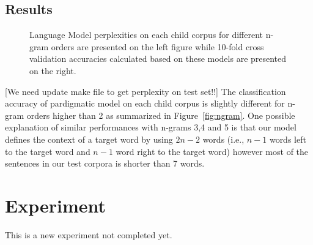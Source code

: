 \subsection{Results}
\begin{figure}[h!]
  \caption{Language Model perplexities on each child corpus for different
  n-gram orders are presented on the left figure while 10-fold cross validation
  accuracies calculated based on these models are presented on the right.} 
\end{figure}
[We need update make file to get perplexity on test set!!] The classification
accuracy of pardigmatic model on each child corpus is slightly different for
n-gram orders higher than 2 as summarized in Figure~\ref{fig:ngram}.  One
possible explanation of similar performances with n-grams 3,4 and 5 is that our
model defines the context of a target word by using $2n-2$ words (i.e., $n-1$
words left to the target word and $n-1$ word right to the target word) however
most of the sentences in our test corpora is shorter than 7 words.  
\section{Experiment }
\label{s:exp4}
This is a new experiment not completed yet.
